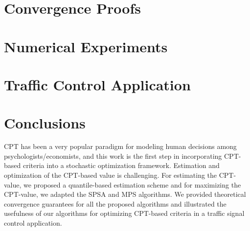 \documentclass[twocolumn]{IEEEtran}
\begin{document}
\section{Convergence Proofs}
\label{sec:convergence}

\section{Numerical Experiments}
\label{sec:expts-simple}


\section{Traffic Control Application}
\label{sec:expts}





\section{Conclusions}
\label{sec:conclusions}
CPT has been a very popular paradigm for modeling human decisions among psychologists/economists, and this work is the first step in incorporating CPT-based criteria into a stochastic optimization framework. Estimation and optimization of the CPT-based value is challenging. 
For estimating the CPT-value, we proposed a quantile-based estimation scheme and for maximizing the CPT-value, we adapted the SPSA \cite{spall} and MPS \cite{chang2013simulation} algorithms. 
We provided theoretical convergence guarantees for all the proposed algorithms and illustrated the usefulness of our algorithms for optimizing CPT-based criteria in a traffic signal control application.



%





%
\end{document}
